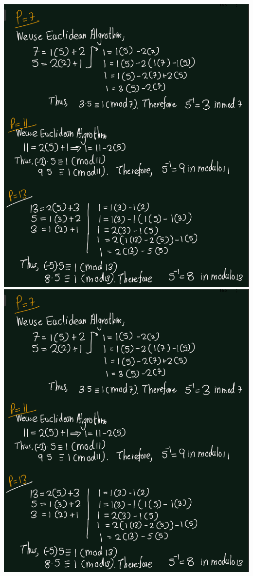 \documentclass[
]{book}
\theoremstyle{definition}
\theoremstyle{definition}
\theoremstyle{definition}
\theoremstyle{definition}
\theoremstyle{remark}
\begin{document}
\includegraphics{figures/ch_3/ex-1.2-1.png}
\includegraphics{figures/ch_3/ex-1.2-1.png}
\end{document}
